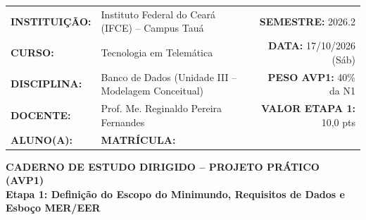 \documentclass[11pt,a4paper]{article}
\begin{document}
\noindent
\begin{tabularx}{\textwidth}{@{} l X r @{}}
\toprule
\textbf{INSTITUIÇÃO:} & Instituto Federal do Ceará (IFCE) -- Campus Tauá & \textbf{SEMESTRE:} 2026.2 \\
\textbf{CURSO:} & Tecnologia em Telemática & \textbf{DATA:} 17/10/2026 (Sáb) \\
\textbf{DISCIPLINA:} & Banco de Dados (Unidade III -- Modelagem Conceitual) & \textbf{PESO AVP1:} 40\% da N1 \\
\textbf{DOCENTE:} & Prof. Me. Reginaldo Pereira Fernandes & \textbf{VALOR ETAPA 1:} 10,0 pts \\
\midrule
\textbf{ALUNO(A):} & \multicolumn{2}{l}{\dotfill \quad \textbf{MATRÍCULA:} \underline{\hspace{3cm}}} \\
\bottomrule
\end{tabularx}

\vspace{0.3cm}
\begin{center}
    {\Large\bfseries CADERNO DE ESTUDO DIRIGIDO -- PROJETO PRÁTICO (AVP1)}\\[0.12cm]
    {\normalsize\bfseries Etapa 1: Definição do Escopo do Minimundo, Requisitos de Dados e Esboço MER/EER}
\end{center}
\end{document}

